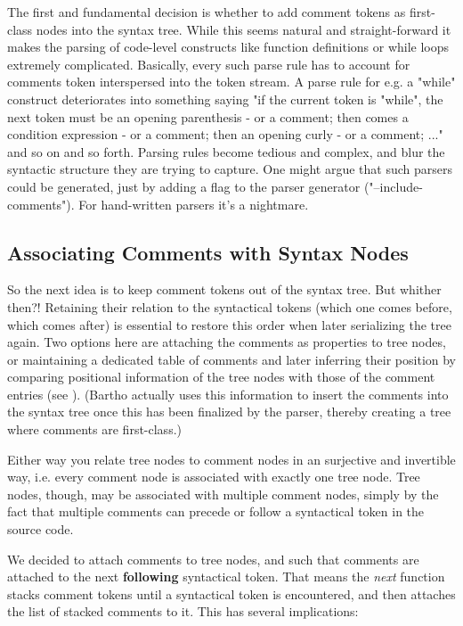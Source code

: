 \documentclass[11pt,a4paper]{article}
\begin{document}
The first and fundamental decision is whether to add comment tokens as
first-class nodes into the syntax tree. While this seems natural and
straight-forward it makes the parsing of code-level constructs like function
definitions or while loops extremely complicated. Basically, every such parse
rule has to account for comments token interspersed into the token stream. A
parse rule for e.g. a "while" construct deteriorates into something saying "if
the current token is "while", the next token must be an opening parenthesis - or
a comment; then comes a condition expression - or a comment; then an opening
curly - or a comment; ..." and so on and so forth. Parsing rules become tedious
and complex, and blur the syntactic structure they are trying to capture. One
might argue that such parsers could be generated, just by adding a flag to the
parser generator ("--include-comments"). For hand-written parsers it's a
nightmare.

\subsection{Associating Comments with Syntax Nodes}

So the next idea is to keep comment tokens out of the syntax tree. But whither
then?! Retaining their relation to the syntactical tokens (which one comes before,
which comes after) is essential to restore this order when later serializing the
tree again. Two options here are attaching the comments as properties to tree
nodes, or maintaining a dedicated table of comments and later inferring their
position by comparing positional information of the tree nodes with those of the
comment entries (see \cite{bartho-2009}). (Bartho actually uses this information
to insert the comments into the syntax tree once this has been finalized by the
parser, thereby creating a tree where comments are first-class.)

Either way you relate tree nodes to comment nodes in an surjective and
invertible way, i.e. every comment node is associated with exactly one tree
node. Tree nodes, though, may be associated with multiple comment nodes, simply
by the fact that multiple comments can precede or follow a syntactical token in
the source code.

We decided to attach comments to tree nodes, and such that comments are attached
to the next \textbf{following} syntactical token. That means the \textit{next}
function stacks comment tokens until a syntactical token is encountered,
and then attaches the list of stacked comments to it. This has several implications:
\end{document}
